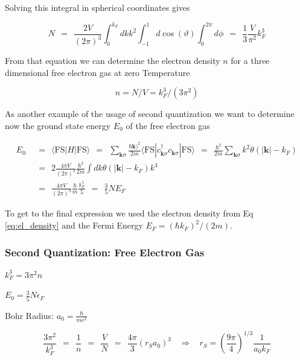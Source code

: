 \documentclass[10pt]{report}
\numberwithin{equation}{chapter}
\newcommand{\refEq}[1]{
  Eq  \ref{#1}
}
\begin{document}
Solving this integral in spherical coordinates gives

\begin{equation}
  N ~~=~~ \frac{2V}{(2\pi)^3} \int_0^{k_F} dk k^2 \int_{-1}^1 d\cos(\vartheta) \int_0^{2\pi} d\phi
  ~~=~~ \frac{1}{3} \frac{V}{\pi^2} k_F^3
\end{equation}

From that equation we can determine the electron density  $n$ for a  three dimensional free electron gas at zero Temperature 

\begin{equation}\label{eq:el_density}
  n = N/V = k_F^3/(3\pi^2)
\end{equation}


As another example of the usage of second quantization we want to determine now the ground state energy $E_0$ of the free electron gas

\begin{align}
  E_0 ~~& =~~ \langle \text{FS} | H | \text{FS} \rangle 
  ~~=~~ \sum_{\mathbf{k} \sigma} \frac{\hbar \mathbf{k})^2}{2m} \langle \text{FS} | c^\dag_{\mathbf{k} \sigma} c_{\mathbf{k} \sigma} | \text{FS} \rangle
  ~~=~~ \frac{\hbar^2}{2m} \sum_{\mathbf{k}\sigma} k^2 \theta(|\mathbf{k}| - k_F) \nonumber \\ 
  ~~& =~~ 2 \frac{4\pi V}{(2\pi)^3} \frac{\hbar^2}{2m} \int dk \theta(|\mathbf{k}| - k_F) k^4\nonumber \\
  ~~& =~~ \frac{4\pi V}{(2\pi)^3} \frac{\hbar}{m} \frac{k_F^5}{5} ~~=~~ \frac{3}{5} N E_F
\end{align}

To get to the final expression we used the electron density from \refEq{eq:el_density} and the Fermi Energy $E_F = (\hbar k_F)^2/(2m)$. 








\subsubsection*{Second Quantization: Free Electron Gas} %

$ k_F^3 = 3 \pi^2 n$

$ E_0 = \frac{3}{5} N \epsilon_F$

Bohr Radius: $a_0 = \frac{\hbar}{m e^2}$

\begin{equation*}
\frac{3 \pi^2}{k_F^3} ~~ = ~~ \frac{1}{n} ~~ = ~~ \frac{V}{N} ~~ = ~~ \frac{4\pi}{3} \left(r_S a_0 \right)^3 ~~~~ \Rightarrow ~~~~ r_S = \left( \frac{9\pi}{4} \right)^{1/3} \frac{1}{a_0 k_F}
\end{equation*}
\end{document}
